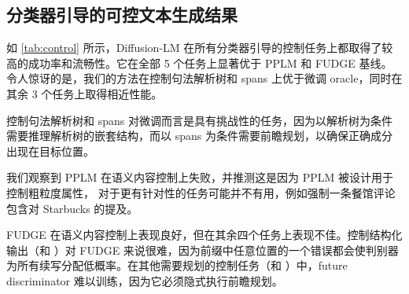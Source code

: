 \documentclass{article}
\begin{document}
\subsection{分类器引导的可控文本生成结果}
\label{ssec:control}
\begin{table}
\centering
{}
\caption{\label{tab:control} Diffusion-LM 在全部 5 个控制任务上取得高成功率（\success）和良好流畅性（\fluency），优于 PPLM 和 FUDGE 基线。我们的方法在控制句法解析树和 spans 方面甚至优于微调 oracle（FT）。}
\end{table}
如 \cref{tab:control} 所示，Diffusion-LM 在所有分类器引导的控制任务上都取得了较高的成功率和流畅性。它在全部 5 个任务上显著优于 PPLM 和 FUDGE 基线。令人惊讶的是，我们的方法在控制句法解析树和 spans 上优于微调 oracle，同时在其余 3 个任务上取得相近性能。

控制句法解析树和 spans 对微调而言是具有挑战性的任务，因为以解析树为条件需要推理解析树的嵌套结构，而以 spans 为条件需要前瞻规划，以确保正确成分出现在目标位置。

我们观察到 PPLM 在语义内容控制上失败，并推测这是因为 PPLM 被设计用于控制粗粒度属性，
对于更有针对性的任务可能并不有用，例如强制一条餐馆评论包含对 Starbucks 的提及。


FUDGE 在语义内容控制上表现良好，但在其余四个任务上表现不佳。控制结构化输出（\POS 和 \Syntax）对 FUDGE 来说很难，因为前缀中任意位置的一个错误都会使判别器为所有续写分配低概率。在其他需要规划的控制任务（\Length 和 \Spans）中，future discriminator 难以训练，因为它必须隐式执行前瞻规划。
\end{document}
